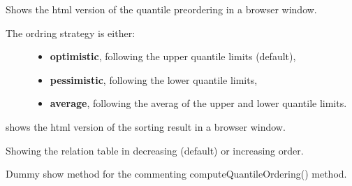 \documentclass[letterpaper,10pt,english]{sphinxmanual}
\begin{document}
\begin{fulllineitems}
\begin{fulllineitems}
\label{techDoc:sortingDigraphs.QuantilesSortingDigraph.showHTMLQuantileOrdering}
Shows the html version of the quantile preordering in a browser window.
\begin{description}
\item[{The ordring strategy is either:}] \leavevmode\begin{itemize}
\item {} 
\textbf{optimistic}, following the upper quantile limits (default),

\item {} 
\textbf{pessimistic}, following the lower quantile limits,

\item {} 
\textbf{average}, following the averag of the upper and lower quantile limits.

\end{itemize}

\end{description}

\end{fulllineitems}


\begin{fulllineitems}
\label{techDoc:sortingDigraphs.QuantilesSortingDigraph.showHTMLSorting}
shows the html version of the sorting result in a browser window.

\end{fulllineitems}


\begin{fulllineitems}
\label{techDoc:sortingDigraphs.QuantilesSortingDigraph.showOrderedRelationTable}
Showing the relation table in decreasing (default) or increasing order.

\end{fulllineitems}


\begin{fulllineitems}
\label{techDoc:sortingDigraphs.QuantilesSortingDigraph.showQuantileOrdering}
Dummy show method for the commenting computeQuantileOrdering() method.


\end{fulllineitems}
\end{fulllineitems}
\end{document}
